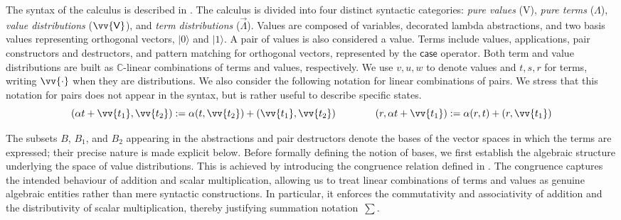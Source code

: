 \documentclass[runningheads,orivec,envcountsame,envcountsect]{llncs}
\newcommand\ket[1]{\ensuremath{|#1\rangle}}
\newcommand\s[1]{\ensuremath{\mathsf{#1}}}
\newcommand\Val{{\s V}}
\DeclareRobustCommand{\ValD}{\ensuremath{\vv{\mathsf{V}}}}
\def\C{\mathbb{C}}            %
\def\Val{\mathrm{V}}          %
\def\Pair#1#2{(#1,#2)} %
\begin{document}
The syntax of the calculus is described in
. The calculus is divided into four
distinct syntactic categories: \emph{pure values} ($\Val$), \emph{pure terms}
($\Lambda$), \emph{value distributions} ($\ValD$), and \emph{term
distributions} ($\vec\Lambda$). Values are composed of variables, decorated
lambda abstractions, and two basis values representing orthogonal vectors,
$\ket 0$ and $\ket 1$. A pair of values is also considered a value.  Terms
include values, applications, pair constructors and destructors, and pattern
matching for orthogonal vectors, represented by the $\mathsf{case}$ operator.
Both term and value distributions are built as $\C$-linear combinations of
terms and values, respectively. 
We use $v,u,w$ to denote values and $t,s,r$ for terms, writing $\vv{\cdot}$ when
they are distributions.
We also consider the following notation for linear combinations of
pairs. We stress that this notation for pairs does not appear in the syntax,
but is rather useful to describe specific states.
\[
  \Pair{\alpha  t+\vv{t_1}}{\vv{t_2}} 
  := \alpha\Pair{t}{\vv{t_2}} + \Pair{\vv{t_1}}{\vv{t_2}}
  \qquad\qquad
  \Pair{r}{\alpha  t+\vv{t_1}} 
  := \alpha\Pair{r}{t} + \Pair{r}{\vv{t_1}}
\]


The subsets $B$, $B_1$, and $B_2$ appearing in the abstractions and pair
destructors denote the bases of the vector spaces in which the terms are
expressed; their precise nature is made explicit below.
Before formally defining the notion of bases, we first establish the
algebraic structure underlying the space of value distributions.
This is achieved by introducing the congruence relation defined in
.
The congruence captures the intended behaviour of addition and scalar
multiplication, allowing us to treat linear combinations of terms and values
as genuine algebraic entities rather than mere syntactic constructions.
In particular, it enforces the commutativity and associativity of addition and
the distributivity of scalar multiplication, thereby justifying summation
notation~$\sum$.
\end{document}
